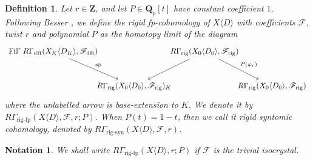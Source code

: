 \documentclass[cjm]{ipart}
\theoremstyle{plain}
\newtheorem{definition}[theorem]{Definition}
\newtheorem{notation}[theorem]{Notation}
\theoremstyle{remark}
\DeclareMathOperator{\Fil}{Fil}
\DeclareMathOperator{\rigfp}{rig-fp}
\DeclareMathOperator{\rigsyn}{rig-syn}
\newcommand{\QQ}{\mathbf{Q}}
\newcommand{\Qp}{\QQ_p}
\newcommand{\ZZ}{\mathbf{Z}}
\newcommand{\dR}{\mathrm{dR}}
\newcommand{\rig}{\mathrm{rig}}
\newcommand{\sF}{\mathscr{F}}
\numberwithin{equation}{subsection}
\begin{document}
  \begin{definition}
    Let $r \in \ZZ$, and let $P \in \Qp[t]$ have constant coefficient $1$. Following Besser \cite{besser12}, we define the \emph{rigid fp-cohomology} of $X\langle D\rangle$ with coefficients $\sF$, twist $r$ and polynomial $P$ as the homotopy limit of the diagram
    \begin{equation}
     \label{eq:rigsyn}
     \begin{tikzcd}[row sep=large, column sep=-1em]
      \Fil^r R\Gamma_{\dR}(X_K\langle D_K\rangle, \sF_{\dR})
        \arrow[dr, "{\scriptstyle \operatorname{sp}}"]
      &&
      R\Gamma_{\rig}(X_0\langle D_0\rangle,\sF_{\rig})
        \arrow[dl]
        \arrow[dr, "{\scriptstyle P(\varphi_r)}"]
      \\
      &
      R\Gamma_{\rig}(X_0\langle D_0\rangle,\sF_{\rig})_K
      &
      &
      R\Gamma_{\rig}(X_0\langle D_0\rangle,\sF_{\rig})
     \end{tikzcd}
    \end{equation}
    where the unlabelled arrow is base-extension to $K$. We denote it by $R\Gamma_{\rigfp}(X\langle D\rangle,\sF,r;P)$. When $P(t)=1-t$, then we call it \emph{rigid syntomic cohomology}, denoted by $R\Gamma_{\rigsyn}(X\langle D\rangle, \sF, r)$.
  \end{definition}

  \begin{notation}
   We shall write $R\Gamma_{\rigfp}(X\langle D\rangle,r;P)$ if $\sF$ is the trivial isocrystal.
  \end{notation}
\end{document}

